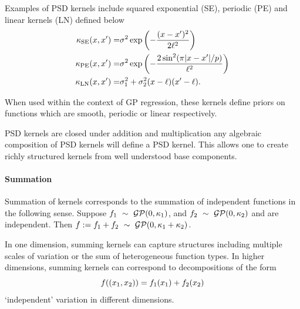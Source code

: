 \documentclass[twoside]{article}
\begin{document}
Examples of PSD kernels include squared exponential (SE), periodic (PE) and linear kernels (LN) defined below
\begin{eqnarray}
\kappa_\textrm{SE}(x, x') = & \sigma^2\exp\left(-\frac{(x - x')^2}{2\ell^2}\right) \\
\kappa_\textrm{PE}(x, x') = & \sigma^2\exp\left(-\frac{2\sin^2(\pi|x - x'|/p)}{\ell^2}\right) \\
\kappa_\textrm{LN}(x, x') = & \sigma_1^2 + \sigma_2^2(x - \ell)(x' - \ell).
\end{eqnarray}

When used within the context of GP regression, these kernels define priors on functions which are smooth, periodic or linear respectively.

PSD kernels are closed under addition and multiplication \ie any algebraic composition of PSD kernels will define a PSD kernel.
This allows one to create richly structured kernels from well understood base components.

%


\paragraph{Summation}

Summation of kernels corresponds to the summation of independent functions in the following sense.
Suppose ${f_1 \ \sim\  \mathcal{GP}(0, \kappa_1)}$, and ${f_2 \ \sim\  \mathcal{GP}(0, \kappa_2)}$ and are independent.
Then ${f := f_1 + f_2 \ \sim\  \mathcal{GP}(0, \kappa_1 + \kappa_2)}$\footnotemark.

In one dimension, summing kernels can capture structures including multiple scales of variation or the sum of heterogeneous function types.
In higher dimensions, summing kernels can correspond to decompositions of the form
\begin{equation}
f((x_1, x_2)) = f_1(x_1) + f_2(x_2)
\end{equation}
\ie `independent' variation in different dimensions.
%

\end{document}

